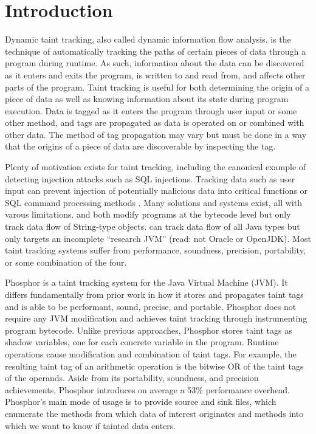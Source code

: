 \chapter{Introduction}

Dynamic taint tracking, also called dynamic information flow analysis, is the technique of automatically tracking the paths of certain pieces of data through a program during runtime. As such, information about the data can be discovered as it enters and exits the program, is written to and read from, and affects other parts of the program. Taint tracking is useful for both determining the origin of a piece of data as well as knowing information about its state during program execution. Data is tagged as it enters the program through user input or some other method, and tags are propagated as data is operated on or combined with other data. The method of tag propagation may vary but must be done in a way that the origins of a piece of data are discoverable by inspecting the tag.

Plenty of motivation exists for taint tracking, including the canonical example of detecting injection attacks such as SQL injections. Tracking data such as user input can prevent injection of potentially malicious data into critical functions or SQL command processing methods \cite{sql1} \cite{sql2}. Many solutions and systems exist, all with varous limitations. \cite{stringtaint} and \cite{sql1} both modify programs at the bytecode level but only track data flow of String-type objects. \cite{jikes} can track data flow of all Java types but only targets an incomplete ``research JVM'' (read: not Oracle or OpenJDK).  Most taint tracking systems suffer from performance, soundness, precision, portability, or some combination of the four. 

Phosphor \cite{phosphor_oopsla} is a taint tracking system for the Java Virtual Machine (JVM). It differs fundamentally from prior work in how it stores and propagates taint tags and is able to be performant, sound, precise, and portable. Phosphor does not require any JVM modification and achieves taint tracking through instrumenting program bytecode. Unlike previous approaches, Phosphor stores taint tags as shadow variables, one for each concrete variable in the program. Runtime operations cause modification and combination of taint tags. For example, the resulting taint tag of an arithmetic operation is the bitwise OR of the taint tags of the operands. Aside from its portability, soundness, and precision achievements, Phosphor introduces on average a 53\% performance overhead. Phosphor's main mode of usage is to provide source and sink files, which enumerate the methods from which data of interest originates and methods into which we want to know if tainted data enters. 

